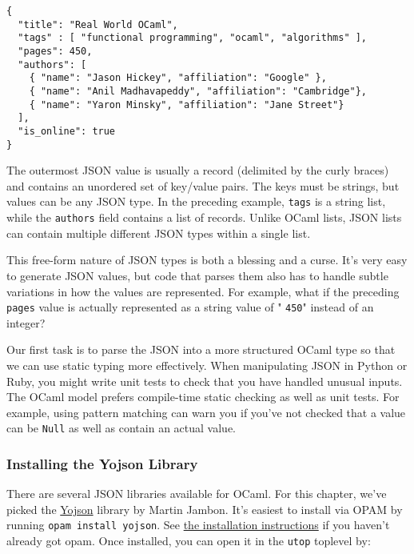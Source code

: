 \begin{lstlisting}
{
  "title": "Real World OCaml",
  "tags" : [ "functional programming", "ocaml", "algorithms" ],
  "pages": 450,
  "authors": [
    { "name": "Jason Hickey", "affiliation": "Google" },
    { "name": "Anil Madhavapeddy", "affiliation": "Cambridge"},
    { "name": "Yaron Minsky", "affiliation": "Jane Street"}
  ],
  "is_online": true
}
\end{lstlisting}

The outermost JSON value is usually a record (delimited by the curly
braces) and contains an unordered set of key/value pairs. The keys must
be strings, but values can be any JSON type. In the preceding example,
\passthrough{\lstinline!tags!} is a string list, while the
\passthrough{\lstinline!authors!} field contains a list of records.
Unlike OCaml lists, JSON lists can contain multiple different JSON types
within a single list.

This free-form nature of JSON types is both a blessing and a curse. It's
very easy to generate JSON values, but code that parses them also has to
handle subtle variations in how the values are represented. For example,
what if the preceding \passthrough{\lstinline!pages!} value is actually
represented as a string value of " \passthrough{\lstinline!450!}"
instead of an integer? 

Our first task is to parse the JSON into a more structured OCaml type so
that we can use static typing more effectively. When manipulating JSON
in Python or Ruby, you might write unit tests to check that you have
handled unusual inputs. The OCaml model prefers compile-time static
checking as well as unit tests. For example, using pattern matching can
warn you if you've not checked that a value can be
\passthrough{\lstinline!Null!} as well as contain an actual value.

\hypertarget{installing-the-yojson-library}{%
\subsubsection{Installing the Yojson
Library}\label{installing-the-yojson-library}}

There are several JSON libraries available for OCaml. For this chapter,
we've picked the \href{https://github.com/mjambon/yojson}{Yojson}
library by Martin Jambon. It's easiest to install via OPAM by running
\passthrough{\lstinline!opam install yojson!}. See
\href{install.html}{the installation instructions} if you haven't
already got opam. Once installed, you can open it in the
\passthrough{\lstinline!utop!} toplevel by:

